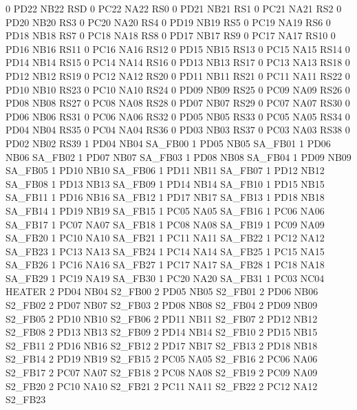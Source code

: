 0   PD22    NB22    RSD
0   PC22    NA22    RS0
0   PD21    NB21    RS1
0   PC21    NA21    RS2
0   PD20    NB20    RS3
0   PC20    NA20    RS4
0   PD19    NB19    RS5
0   PC19    NA19    RS6
0   PD18    NB18    RS7
0   PC18    NA18    RS8
0   PD17    NB17    RS9
0   PC17    NA17    RS10
0   PD16    NB16    RS11
0   PC16    NA16    RS12
0   PD15    NB15    RS13
0   PC15    NA15    RS14
0   PD14    NB14    RS15
0   PC14    NA14    RS16
0   PD13    NB13    RS17
0   PC13    NA13    RS18
0   PD12    NB12    RS19
0   PC12    NA12    RS20
0   PD11    NB11    RS21
0   PC11    NA11    RS22
0   PD10    NB10    RS23
0   PC10    NA10    RS24
0   PD09    NB09    RS25
0   PC09    NA09    RS26
0   PD08    NB08    RS27
0   PC08    NA08    RS28
0   PD07    NB07    RS29
0   PC07    NA07    RS30
0   PD06    NB06    RS31
0   PC06    NA06    RS32
0   PD05    NB05    RS33
0   PC05    NA05    RS34
0   PD04    NB04    RS35
0   PC04    NA04    RS36
0   PD03    NB03    RS37
0   PC03    NA03    RS38
0   PD02    NB02    RS39
1   PD04    NB04    SA_FB00
1   PD05    NB05    SA_FB01
1   PD06    NB06    SA_FB02
1   PD07    NB07    SA_FB03
1   PD08    NB08    SA_FB04
1   PD09    NB09    SA_FB05
1   PD10    NB10    SA_FB06
1   PD11    NB11    SA_FB07
1   PD12    NB12    SA_FB08
1   PD13    NB13    SA_FB09
1   PD14    NB14    SA_FB10
1   PD15    NB15    SA_FB11
1   PD16    NB16    SA_FB12
1   PD17    NB17    SA_FB13
1   PD18    NB18    SA_FB14
1   PD19    NB19    SA_FB15
1   PC05    NA05    SA_FB16
1   PC06    NA06    SA_FB17
1   PC07    NA07    SA_FB18
1   PC08    NA08    SA_FB19
1   PC09    NA09    SA_FB20
1   PC10    NA10    SA_FB21
1   PC11    NA11    SA_FB22
1   PC12    NA12    SA_FB23
1   PC13    NA13    SA_FB24
1   PC14    NA14    SA_FB25
1   PC15    NA15    SA_FB26
1   PC16    NA16    SA_FB27
1   PC17    NA17    SA_FB28
1   PC18    NA18    SA_FB29
1   PC19    NA19    SA_FB30
1   PC20    NA20    SA_FB31
1   PC03    NC04    HEATER
2   PD04    NB04    S2_FB00
2   PD05    NB05    S2_FB01
2   PD06    NB06    S2_FB02
2   PD07    NB07    S2_FB03
2   PD08    NB08    S2_FB04
2   PD09    NB09    S2_FB05
2   PD10    NB10    S2_FB06
2   PD11    NB11    S2_FB07
2   PD12    NB12    S2_FB08
2   PD13    NB13    S2_FB09
2   PD14    NB14    S2_FB10
2   PD15    NB15    S2_FB11
2   PD16    NB16    S2_FB12
2   PD17    NB17    S2_FB13
2   PD18    NB18    S2_FB14
2   PD19    NB19    S2_FB15
2   PC05    NA05    S2_FB16
2   PC06    NA06    S2_FB17
2   PC07    NA07    S2_FB18
2   PC08    NA08    S2_FB19
2   PC09    NA09    S2_FB20
2   PC10    NA10    S2_FB21
2   PC11    NA11    S2_FB22
2   PC12    NA12    S2_FB23
